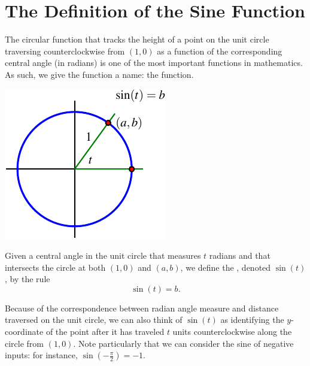 \documentclass[nooutcomes]{ximera}
\begin{document}

\section{The Definition of the Sine Function}

The circular function that tracks the height of a point on the unit circle traversing counterclockwise from \((1,0)\) as a function of the corresponding central angle (in radians) is one of the most important functions in mathematics.  As such, we give the function a name:  the  function.%

\begin{definition}
\begin{image}
\includegraphics{sine-defn.pdf}
\end{image}
Given a central angle in the unit circle that measures \(t\) radians and that intersects the circle at both \((1,0)\) and \((a,b)\), we define the , denoted \(\sin(t)\), by the rule
\begin{equation*}
\sin(t) = b\text{.}
\end{equation*}
\end{definition}

Because of the correspondence between radian angle measure and distance traversed on the unit circle, we can also think of \(\sin(t)\) as identifying the \(y\)-coordinate of the point after it has traveled \(t\) units counterclockwise along the circle from \((1,0)\).  Note particularly that we can consider the sine of negative inputs:  for instance, \(\sin(-\frac{\pi}{2}) = -1\).
\end{document}
